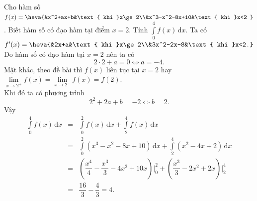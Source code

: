 \begin{ex}%
Cho hàm số $f(x)=\heva{&x^2+ax+b&\text{ khi }x\ge2\\&x^3-x^2-8x+10&\text{ khi }x<2 }$. Biết hàm số có đạo hàm tại điểm $x=2$. Tính $\displaystyle\int\limits_0^4 f(x)\mathrm{\,d}x$.
\loigiai
{
Ta có $f'(x)=\heva{&2x+a&\text{ khi }x\ge2\\&3x^2-2x-8&\text{ khi }x<2.}$\\
Do hàm số có đạo hàm tại $x=2$ nên ta có
\[2\cdot2+a=0\Leftrightarrow a=-4.\]
Mặt khác, theo đề bài thì $f(x)$ liên tục tại $x=2$ hay $\lim\limits_{x\to2^+}f(x)=\lim\limits_{x\to2^-}f(x)=f(2)$.\\
Khi đó ta có phương trình
\[2^2+2a+b=-2\Leftrightarrow b=2.\]
Vậy
\begin{eqnarray*}
\displaystyle\int\limits_0^4 f(x)\mathrm{\,d}x&= & \displaystyle\int\limits_0^2 f(x)\mathrm{\,d}x+\displaystyle\int\limits_2^4 f(x)\mathrm{\,d}x\\
& = & \displaystyle\int\limits_0^2(x^3-x^2-8x+10)\mathrm{\,d}x+\displaystyle\int\limits_2^4(x^2-4x+2)\mathrm{\,d}x\\
& = & \left(\dfrac{x^4}{4}-\dfrac{x^3}{3}-4x^2+10x\right)\bigg|_0^2+\left(\dfrac{x^3}{3}-2x^2+2x\right)\bigg|_2^4\\
& = & \dfrac{16}{3}-\dfrac{4}{3}=4.
\end{eqnarray*}
}
\end{ex}


